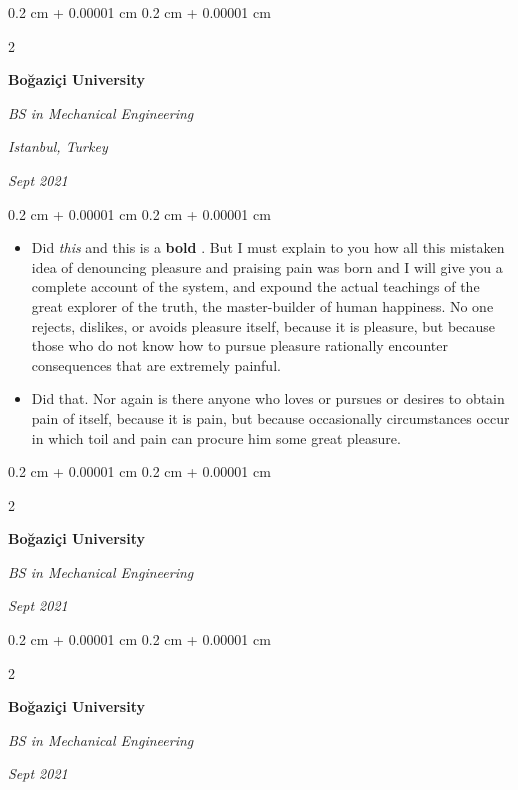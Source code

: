 \documentclass[10pt, letterpaper]{article}
\newenvironment{highlights}{
    \begin{itemize}[
        topsep=0.10 cm,
        parsep=0.10 cm,
        partopsep=0pt,
        itemsep=0pt,
        leftmargin=0.4 cm + 10pt
    ]
}{
    \end{itemize}
} %
\newenvironment{onecolentry}{
    \begin{adjustwidth}{
        0.2 cm + 0.00001 cm
    }{
        0.2 cm + 0.00001 cm
    }
}{
    \end{adjustwidth}
} %
\newenvironment{twocolentry}[2][]{
    \onecolentry
    \def\secondColumn{#2}
    \setcolumnwidth{\fill, 4.5 cm}
    \begin{paracol}{2}
}{
    \switchcolumn \raggedleft \secondColumn
    \end{paracol}
    \endonecolentry
} %
\let\hrefWithoutArrow\href
\renewcommand{\href}[2]{\hrefWithoutArrow{#1}{\ifthenelse{\equal{#2}{}}{ }{#2 }\raisebox{.15ex}{\footnotesize \faExternalLink*}}}
\begin{document}
        \vspace{0.2 cm}

        \begin{twocolentry}{
        \textit{Istanbul, Turkey}    
            
        \textit{Sept 2021}}
            \textbf{Boğaziçi University}

            \textit{BS in Mechanical Engineering}
        \end{twocolentry}

        \vspace{0.10 cm}
        \begin{onecolentry}
            \begin{highlights}
                \item Did \textit{this} and this is a \textbf{bold} \href{https://example.com}{link}. But I must explain to you how all this mistaken idea of denouncing pleasure and praising pain was born and I will give you a complete account of the system, and expound the actual teachings of the great explorer of the truth, the master-builder of human happiness. No one rejects, dislikes, or avoids pleasure itself, because it is pleasure, but because those who do not know how to pursue pleasure rationally encounter consequences that are extremely painful.
                \item Did that. Nor again is there anyone who loves or pursues or desires to obtain pain of itself, because it is pain, but because occasionally circumstances occur in which toil and pain can procure him some great pleasure.
            \end{highlights}
        \end{onecolentry}


        \vspace{0.2 cm}

        \begin{twocolentry}{
            
            
        \textit{Sept 2021}}
            \textbf{Boğaziçi University}

            \textit{BS in Mechanical Engineering}
        \end{twocolentry}



        \vspace{0.2 cm}

        \begin{twocolentry}{
            
            
        \textit{Sept 2021}}
            \textbf{Boğaziçi University}

            \textit{BS in Mechanical Engineering}
        \end{twocolentry}
\end{document}
